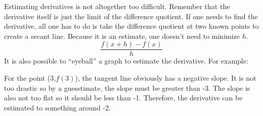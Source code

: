 \documentclass[../revisedMain.tex]{subfiles}
\begin{document}
	Estimating derivatives is not altogether too difficult. Remember that the derivative itself is just the limit of the difference quotient. If one needs to find the derivative, all one has to do is take the difference quotient at two known points to create a secant line. Because it is an estimate, one doesn't need to minimize $h$.$$\frac{f(x+h)-f(x)}{h}$$ It is also possible to ``eyeball'' a graph to estimate the derivative. For example:
	\begin{center}
	\end{center}
	For the point (3,$f(3)$), the tangent line obviously has a negative slope. It is not too drastic so by a guesstimate, the slope must be greater than -3. The slope is also not too flat so it should be less than -1. Therefore, the derivative can be estimated to something around -2.
\end{document}
